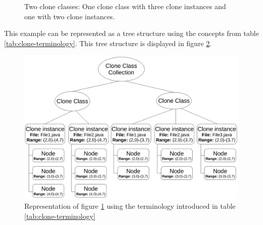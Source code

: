 \begin{figure}[H]
\begin{parcolumns}{3}
\end{parcolumns}
\caption{Two clone classes: One clone class with three clone instances and one with two clone instances.}
\label{fig:cloneclasses}
\end{figure}

This example can be represented as a tree structure using the concepts from table \ref{tab:clone-terminology}. This tree structure is displayed in figure \ref{fig:terminologyexample}.

\begin{figure}[H]
  \includegraphics[width=1\columnwidth]{img/TerminologyExample}
  \caption{Representation of figure \ref{fig:cloneclasses} using the terminology introduced in table \ref{tab:clone-terminology}}
  \label{fig:terminologyexample}
\end{figure}

